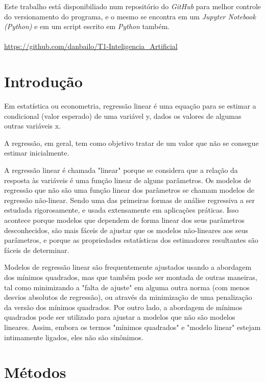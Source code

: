 \documentclass[a4paper, 12pt]{article}
\begin{document}

Este trabalho está disponibiliado num repositório do {\it GitHub} para melhor controle do versionamento do 
programa, e o mesmo se encontra em um \textit{Jupyter Notebook (Python)} e em um script escrito em \textit{Python} também.\\~\\
\url{https://github.com/danbailo/T1-Inteligencia_Artificial}
\clearpage

\section{Introdução}

Em estatística ou econometria, regressão linear é uma equação para se estimar a condicional (valor esperado) de uma
variável y, dados os valores de algumas outras variáveis x.

A regressão, em geral, tem como objetivo tratar de um valor que não se consegue estimar inicialmente.

A regressão linear é chamada "linear" porque se considera que a relação da resposta às variáveis é uma função 
linear de alguns parâmetros. Os modelos de regressão que não são uma função linear dos parâmetros se chamam modelos 
de regressão não-linear. Sendo uma das primeiras formas de análise regressiva a ser estudada rigorosamente, e usada 
extensamente em aplicações práticas. Isso acontece porque modelos que dependem de forma linear dos seus parâmetros 
desconhecidos, são mais fáceis de ajustar que os modelos não-lineares aos seus parâmetros, e porque as propriedades 
estatísticas dos estimadores resultantes são fáceis de determinar.

Modelos de regressão linear são frequentemente ajustados usando a abordagem dos mínimos quadrados, mas que também 
pode ser montada de outras maneiras, tal como minimizando a "falta de ajuste" em alguma outra norma (com menos desvios 
absolutos de regressão), ou através da minimização de uma penalização da versão dos mínimos quadrados. Por outro 
lado, a abordagem de mínimos quadrados pode ser utilizado para ajustar a modelos que não são modelos lineares. Assim, 
embora os termos "mínimos quadrados" e "modelo linear" estejam intimamente ligados, eles não são sinônimos. 

\clearpage

\section{Métodos}
\end{document}
